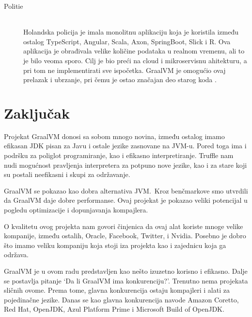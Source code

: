 \documentclass[a4paper]{article}
\begin{document}
\begin{description}
	\item[Politie]  \hfill \\
	Holandska policija je imala monolitnu aplikaciju koja je koristila između ostalog TypeScript, Angular, Scala, Axon, SpringBoot, Slick i R. Ova aplikacija je obrađivala velike količine podataka u realnom vremenu, ali to je bilo veoma sporo. Cilj je bio preći na cloud i mikroservisnu ahitekturu, a pri tom ne implementirati sve ispočetka. GraalVM je omogućio ovaj prelazak i ubrzanje, pri čemu je ostao značajan deo starog koda \cite{graalvmusecases}.
\end{description}

\section{Zaključak}
\label{sec:zakljucak}

Projekat GraalVM donosi sa sobom mnogo novina, između ostalog imamo efikasan JDK pisan za Javu i ostale jezike zasnovane na JVM-u. Pored toga ima i podršku za poliglot programiranje, kao i efikasno interpretiranje. Truffle nam nudi mogućnost pravljenja interpretera za potpuno nove jezike, kao i za stare koji su postali neefikasni i skupi za održavanje.

GraalVM se pokazao kao dobra alternativa JVM.~Kroz benčmarkove smo utvrdili da GraalVM daje dobre performanse. Ovaj projekat je pokazao veliki potencijal u pogledu optimizacije i dopunjavanja kompajlera.

O kvalitetu ovog projekta nam govori činjenica da ovaj alat koriste mnoge velike kompanije, između ostalih, Oracle, Facebook, Twitter, i Nvidia. Posebno je dobro što imamo veliku kompaniju koja stoji iza projekta kao i zajednicu koja ga održava.

GraalVM je u ovom radu predstavljen kao nešto izuzetno korisno i efikasno. Dalje se postavlja pitanje `Da li GraalVM ima konkurenciju?'. Trenutno nema projekata sličnih ovome. Prema tome, glavna konkurencija ostaju kompajleri i alati za pojedinačne jezike. Danas se kao glavna konkurencija navode Amazon Coretto, Red Hat, OpenJDK, Azul Platform Prime i Microsoft Build of OpenJDK. 

\appendix
 

\end{document}
